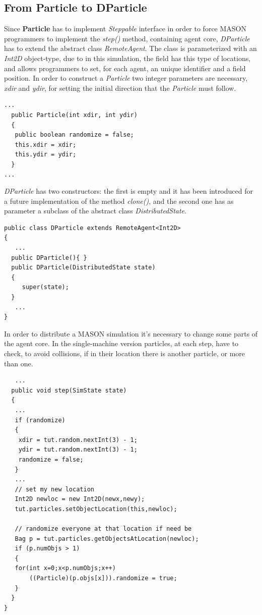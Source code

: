 \documentclass[12pt]{article}
\begin{document}
\subsection{From Particle to DParticle}
Since \textbf{Particle} has to implement \textit{Steppable} interface in order to force MASON programmers to implement the \textit{step()} method, containing agent core, \textit{DParticle} has to extend the abstract class \textit{RemoteAgent}. The class is parameterized with an \textit{Int2D} object-type, due to in this simulation, the field has this type of locations, and allows programmers to set, for each agent, an unique identifier and a field position.
In order to construct a \textit{Particle} two integer parameters are necessary, \textit{xdir} and \textit{ydir}, for setting the initial direction that the \textit{Particle} must follow.
\begin{lstlisting}
...
  public Particle(int xdir, int ydir)
  {
   public boolean randomize = false;
   this.xdir = xdir;
   this.ydir = ydir;
  }
...
\end{lstlisting}
\medskip
\textit{DParticle} has two constructors: the first is empty and it has been introduced for a future implementation of the method \textit{clone()}, and the second one has as parameter a subclass of the abstract class \textit{DistributedState}.
\begin{lstlisting}
public class DParticle extends RemoteAgent<Int2D>
{
   ...
  public DParticle(){ }
  public DParticle(DistributedState state)
  {
     super(state);
  }
   ...
}
\end{lstlisting}
\medskip
In order to distribute a MASON simulation it's necessary to change some parts of the agent core. In the single-machine version particles, at each step, have to check, to avoid collisions, if in their location there is another particle, or more than one. 
\begin{lstlisting}
   ...
  public void step(SimState state)
  {
   ...
   if (randomize)
   {
    xdir = tut.random.nextInt(3) - 1;
    ydir = tut.random.nextInt(3) - 1;
	randomize = false;
   }
   ...
   // set my new location
   Int2D newloc = new Int2D(newx,newy);
   tut.particles.setObjectLocation(this,newloc);
   
   // randomize everyone at that location if need be
   Bag p = tut.particles.getObjectsAtLocation(newloc);
   if (p.numObjs > 1)
   {
   for(int x=0;x<p.numObjs;x++)
       ((Particle)(p.objs[x])).randomize = true;
   }
  }
}
\end{lstlisting}
\end{document}
